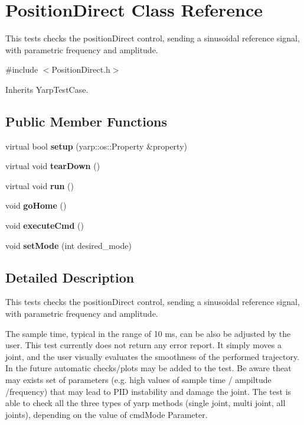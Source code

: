 \section{Position\+Direct Class Reference}
\label{classPositionDirect}


This tests checks the position\+Direct control, sending a sinusoidal reference signal, with parametric frequency and amplitude.  




{\ttfamily \#include $<$Position\+Direct.\+h$>$}



Inherits Yarp\+Test\+Case.

\subsection*{Public Member Functions}
\begin{DoxyCompactItemize}
\item 
\label{classPositionDirect_a65b1833e16c9185db0d488248e59d7cc} 
virtual bool {\bfseries setup} (yarp\+::os\+::\+Property \&property)
\item 
\label{classPositionDirect_a84243f0cd8e5269d486899febfc47cca} 
virtual void {\bfseries tear\+Down} ()
\item 
\label{classPositionDirect_a70210708c01218e1aabbc657a16d85f4} 
virtual void {\bfseries run} ()
\item 
\label{classPositionDirect_a2dd8350755621895f0bb36d176d65e4e} 
void {\bfseries go\+Home} ()
\item 
\label{classPositionDirect_aa6f6d0aafdb7e339fa07bbc5232b4dfb} 
void {\bfseries execute\+Cmd} ()
\item 
\label{classPositionDirect_aa18a4e2b7558adf62e72873a78fed7bd} 
void {\bfseries set\+Mode} (int desired\+\_\+mode)
\end{DoxyCompactItemize}


\subsection{Detailed Description}
This tests checks the position\+Direct control, sending a sinusoidal reference signal, with parametric frequency and amplitude. 

The sample time, typical in the range of 10 ms, can be also be adjusted by the user. This test currently does not return any error report. It simply moves a joint, and the user visually evaluates the smoothness of the performed trajectory. In the future automatic checks/plots may be added to the test. Be aware theat may exists set of parameters (e.\+g. high values of sample time / ampiltude /frequency) that may lead to P\+ID instability and damage the joint. The test is able to check all the three types of yarp methods (single joint, multi joint, all joints), depending on the value of cmd\+Mode Parameter.

